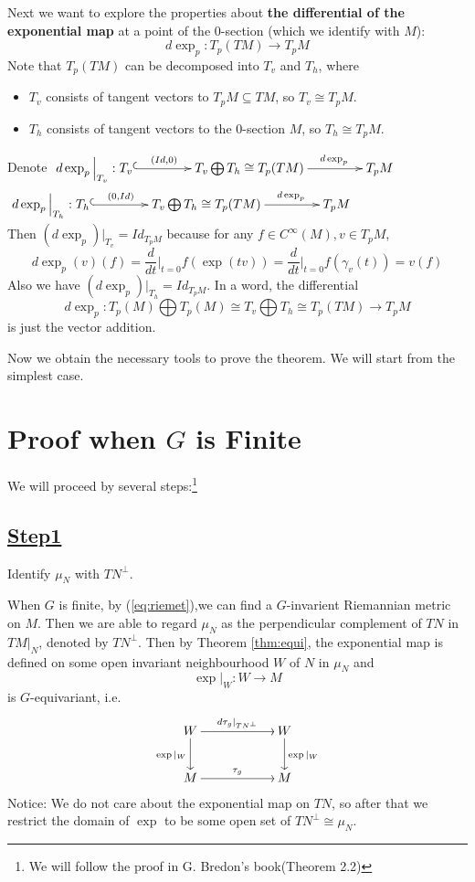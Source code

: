\documentclass[reqno,11pt]{amsart}
\numberwithin{equation}{section}
\theoremstyle{plain}
\theoremstyle{plain}
\numberwithin{equation}{section}
\theoremstyle{remark}
\begin{document}
Next we want to explore the properties about \textbf{the differential of the exponential map} at a point of the 0-section (which we identify with $M$):
$$d \exp_p:T_p(TM) \longrightarrow T_pM$$
Note that $T_p(TM)$ can be decomposed into $T_v$ and $T_h$, where
\begin{itemize}
	\item $T_v$ consists of tangent vectors to $T_pM \subseteq TM$, so $T_v\cong T_pM$.
	\item $T_h$ consists of tangent vectors to the 0-section $M$, so $T_h\cong T_pM$.
\end{itemize}
Denote 
	$\xymatrix@C=1.5cm{
	d\exp_p \Big|_{T_v}: T_v\ar@{^(->}[r]^(0.45){(Id,0)} & T_v \bigoplus T_h\cong T_p(TM)\ar[r]^(0.65){d\exp_p} & T_pM 
}$\\
\phantom{Denote}
	$\xymatrix@C=1.5cm{
	d\exp_p \Big|_{T_h}: T_h\ar@{^(->}[r]^(0.45){(0,Id)} & T_v \bigoplus T_h \cong T_p(TM)\ar[r]^(0.65){d\exp_p} & T_pM 
}$\\
Then $(d\exp_p) \big|_{T_v}=Id_{T_pM}$ because for any $f \in C^{\infty}(M), v \in T_pM$,
$$d\exp_p(v)(f)
=\frac{d}{dt} \bigg|_{t=0}f(\exp (tv))
=\frac{d}{dt} \bigg|_{t=0}f(\gamma_v(t))=v(f)$$
Also we have $(d\exp_p) \big|_{T_h}=Id_{T_pM}$. In a word, the differential
$$\textstyle d\exp_p:T_p(M) \bigoplus T_p(M) \cong T_v \bigoplus T_h \cong T_p(TM) \longrightarrow T_pM$$
is just the vector addition.

Now we obtain the necessary tools to prove the theorem. We will start from the simplest case.
\section{Proof when $G$ is Finite} 
We will proceed by several steps:\footnote{We will follow the proof in G. Bredon's book\cite{GB}(Theorem 2.2)}
\subsection*{\underline{Step1}}Identify $\mu_N$ with $TN^{\perp}$.

When $G$ is finite, by (\ref{eq:riemet}),we can find a $G$-invarient Riemannian metric on $M$. Then we are able to regard $\mu_N$ as the perpendicular complement of $TN$ in $TM|_N$, denoted by $TN^{\perp}$. Then by Theorem \ref{thm:equi}, the exponential map is defined on some open invariant neighbourhood $W$ of $N$ in $\mu_N$ and
$$\exp|_W :W \rightarrow M$$
is $G$-equivariant, i.e.
	\begin{equation*}
\SelectTips{eu}{12}
\xymatrix@C=2cm{
	W\ar[r]^{d\tau_g|_{TN^{\perp}}}\ar[d]_{\exp|_W} & W\ar[d]^{\exp|_W} \\
	M\ar[r]^{\tau_g} & M
}
\end{equation*}
Notice: We do not care about the exponential map on $TN$, so after that we restrict the domain of $\exp$ to be some open set of $TN^{\perp} \cong \mu_N$.
\end{document}
